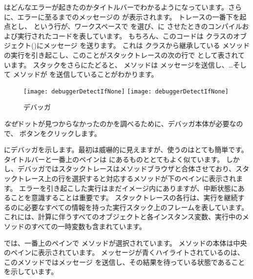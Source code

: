 \documentclass[a4paper,10pt,twoside]{book}
\begin{document}
 はどんなエラーが起きたのかタイトルバーでわかるようになっています。さらに、エラーに至るまでのメッセージの  が表示されます。
トレースの一番下を起点とし、  という行が、ワークスペースで  を選び、\pharo に  させたときのコンパイルおよび実行されたコードを表しています。
もちろん、このコードは  クラスのオブジェクト()にメッセージ  を送ります。
これは  クラスから継承している  メソッドの実行を引き起こし、このことがスタックトレースの次の行で  として表されています。
スタックをさらにたどると、 メソッドは  メッセージを送信し、\ldots そして  メソッドが  を送信していることがわかります。

\begin{figure}[btp]
\begin{center}
\ifluluelse
{\texttt{[image: debuggerDetectIfNone]}}
{\texttt{[image: debuggerDetectIfNone]}}
\end{center}
\caption{デバッガ}
\end{figure}

\emph{なぜ}ドットが見つからなかったのかを調べるために、デバッガ本体が必要なので、 ボタンをクリックします。


 にデバッガを示します。最初は威嚇的に見えますが、使うのはとても簡単です。
タイトルバーと一番上のペインは  にあるものととてもよく似ています。
しかし、デバッガではスタックトレースはメソッドブラウザと合体させており、スタックトレース上の行を選択すると対応するメソッドが下のペインに表示されます。
エラーを引き起こした実行はまだイメージ内にありますが、中断状態にあることを意識することは重要です。
スタックトレースの各行は、実行を継続するのに必要なすべての情報を持った実行スタック上のフレームを表しています。これには、計算に伴うすべてのオブジェクトと各インスタンス変数、実行中のメソッドのすべての一時変数も含まれています。

 では、一番上のペインで  メソッドが選択されています。
メソッドの本体は中央のペインに表示されています。 メッセージが青くハイライトされているのは、このメソッドではメッセージ  を送信し、その結果を待っている状態であることを示しています。
\end{document}
